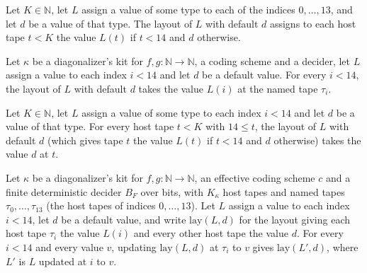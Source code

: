 \begin{definition}
\label{Turing.NTimeDiag.dzLay}
\leanok
Let $K \in \mathbb{N}$, let $L$ assign a value of some type to each of the indices $0, \dots, 13$,
and let $d$ be a value of that type. The layout of $L$ with default $d$ assigns to each host tape
$t < K$ the value $L(t)$ if $t < 14$ and $d$ otherwise.
\end{definition}

\begin{theorem}
\label{Turing.NTimeDiag.dzLay_tp}
\leanok
{}
Let $\kappa$ be a diagonalizer's kit for $f, g : \mathbb{N} \to \mathbb{N}$, a coding scheme and a
decider, let $L$ assign a value to each index $i < 14$ and let $d$ be a default value. For every $i
< 14$, the layout of $L$ with default $d$ takes the value $L(i)$ at the named tape $\tau_i$.
\end{theorem}

\begin{theorem}
\label{Turing.NTimeDiag.dzLay_off}
\leanok
{}
Let $K \in \mathbb{N}$, let $L$ assign a value of some type to each index $i < 14$ and let $d$ be a value of that type. For every host tape $t < K$ with $14 \le t$, the layout of $L$ with default $d$ (which gives tape $t$ the value $L(t)$ if $t < 14$ and $d$ otherwise) takes the value $d$ at $t$.
\end{theorem}

\begin{theorem}
\label{Turing.NTimeDiag.dzLay_update}
\leanok
{}
Let $\kappa$ be a diagonalizer's kit for $f, g : \mathbb{N} \to \mathbb{N}$, an effective coding scheme $c$ and a finite deterministic decider $B_F$ over bits, with $K_\kappa$ host tapes and named tapes $\tau_0, \dots, \tau_{13}$ (the host tapes of indices $0, \dots, 13$). Let $L$ assign a value to each index $i < 14$, let $d$ be a default value, and write $\mathrm{lay}(L, d)$ for the layout giving each host tape $\tau_i$ the value $L(i)$ and every other host tape the value $d$. For every $i < 14$ and every value $v$, updating $\mathrm{lay}(L, d)$ at $\tau_i$ to $v$ gives $\mathrm{lay}(L', d)$, where $L'$ is $L$ updated at $i$ to $v$.
\end{theorem}

